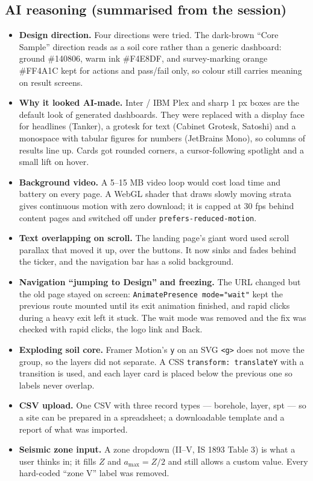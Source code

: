 \documentclass[11pt,a4paper]{article}
\newcommand{\code}[1]{\texttt{\small #1}}
\begin{document}
\subsection{AI reasoning (summarised from the session)}
\begin{itemize}[leftmargin=12pt]
\item \textbf{Design direction.} Four directions were tried. The dark-brown ``Core Sample'' direction reads as a soil
  core rather than a generic dashboard: ground \#140806, warm ink \#F4E8DF, and survey-marking orange \#FF4A1C kept for
  actions and pass/fail only, so colour still carries meaning on result screens.
\item \textbf{Why it looked AI-made.} Inter / IBM Plex and sharp 1 px boxes are the default look of generated
  dashboards. They were replaced with a display face for headlines (Tanker), a grotesk for text (Cabinet Grotesk,
  Satoshi) and a monospace with tabular figures for numbers (JetBrains Mono), so columns of results line up. Cards got
  rounded corners, a cursor-following spotlight and a small lift on hover.
\item \textbf{Background video.} A 5--15 MB video loop would cost load time and battery on every page. A WebGL shader
  that draws slowly moving strata gives continuous motion with zero download; it is capped at 30 fps behind content
  pages and switched off under \code{prefers-reduced-motion}.
\item \textbf{Text overlapping on scroll.} The landing page's giant word used scroll parallax that moved it up, over
  the buttons. It now sinks and fades behind the ticker, and the navigation bar has a solid background.
\item \textbf{Navigation ``jumping to Design'' and freezing.} The URL changed but the old page stayed on screen:
  \code{AnimatePresence mode="wait"} kept the previous route mounted until its exit animation finished, and rapid
  clicks during a heavy exit left it stuck. The wait mode was removed and the fix was checked with rapid clicks, the
  logo link and Back.
\item \textbf{Exploding soil core.} Framer Motion's \code{y} on an SVG \code{<g>} does not move the group, so the layers
  did not separate. A CSS \code{transform: translateY} with a transition is used, and each layer card is placed below
  the previous one so labels never overlap.
\item \textbf{CSV upload.} One CSV with three record types --- borehole, layer, spt --- so a site can be prepared in a
  spreadsheet; a downloadable template and a report of what was imported.
\item \textbf{Seismic zone input.} A zone dropdown (II--V, IS 1893 Table 3) is what a user thinks in; it fills $Z$ and
  $a_\text{max} = Z/2$ and still allows a custom value. Every hard-coded ``zone V'' label was removed.
\end{itemize}
\end{document}
